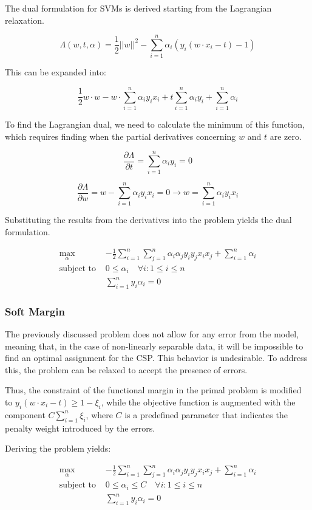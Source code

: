 The dual formulation for SVMs is derived starting from the Lagrangian relaxation.

$$\Lambda(w, t, \alpha) = \frac{1}{2}||w||^2 - \sum_{i=1}^n\alpha_i(y_i(w\cdot x_i - t) - 1)$$

This can be expanded into:

$$\frac{1}{2}w\cdot w - w\cdot\sum_{i=1}^n\alpha_iy_ix_i + t\sum_{i=1}^n\alpha_iy_i + \sum_{i=1}^n\alpha_i$$

To find the Lagrangian dual, we need to calculate the minimum of this function, which requires finding when the partial derivatives concerning $w$ and $t$ are zero.

$$\frac{\partial\Lambda}{\partial t} = \sum_{i=1}^n\alpha_iy_i = 0$$

$$\frac{\partial\Lambda}{\partial w} = w - \sum_{i=1}^n\alpha_iy_ix_i = 0 \to w = \sum_{i=1}^n\alpha_iy_ix_i$$

Substituting the results from the derivatives into the problem yields the dual formulation.

\begin{align*}
    \max_\alpha\ & -\frac{1}{2}\sum_{i=1}^n\sum_{j=1}^n\alpha_i\alpha_jy_iy_jx_ix_j + \sum_{i=1}^n
  \alpha_i \\
    \text{subject to } & 0 \leq \alpha_i \quad \forall i: 1\leq i\leq n \\
    & \sum_{i=1}^ny_i\alpha_i=0
\end{align*}

\subsubsection{Soft Margin}

The previously discussed problem does not allow for any error from the model, meaning that, in the case of non-linearly separable data, it will be impossible to find an optimal assignment for the CSP. This behavior is undesirable. To address this, the problem can be relaxed to accept the presence of errors.

Thus, the constraint of the functional margin in the primal problem is modified to $y_i(w\cdot x_i-t)\geq1-\xi_i$, while the objective function is augmented with the component $C\sum_{i=1}^n\xi_i$, where $C$ is a predefined parameter that indicates the penalty weight introduced by the errors.

Deriving the problem yields:

\begin{align*}
    \max_\alpha\ & -\frac{1}{2}\sum_{i=1}^n\sum_{j=1}^n\alpha_i\alpha_jy_iy_jx_ix_j + \sum_{i=1}^n
  \alpha_i \\
    \text{subject to } & 0 \leq \alpha_i \leq C \quad \forall i: 1\leq i\leq n \\
    & \sum_{i=1}^ny_i\alpha_i=0
\end{align*}

